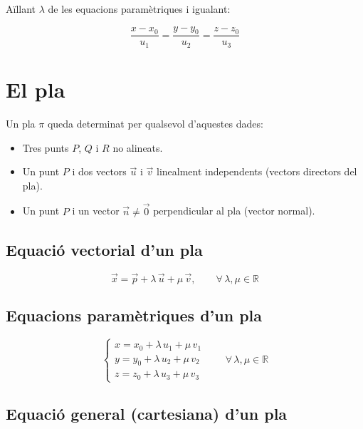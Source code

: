 Aïllant $\lambda$ de les equacions paramètriques i igualant:

\begin{equation*}
\frac{x - x_0}{u_1} = \frac{y - y_0}{u_2} = \frac{z - z_0}{u_3}
\end{equation*}

\section{El pla}

Un pla $\pi$ queda determinat per qualsevol d'aquestes dades:

\begin{itemize}
\item Tres punts $P$, $Q$ i $R$ no alineats.
\item Un punt $P$ i dos vectors $\vec u$ i $\vec v$ linealment independents (vectors directors del pla).
\item Un punt $P$ i un vector $\vec n \neq \vec 0$ perpendicular al pla (vector normal).
\end{itemize}

\subsection{Equació vectorial d'un pla}

\begin{equation*}
\vec x = \vec p + \lambda\,\vec u + \mu\,\vec v, \qquad \forall\,\lambda,\mu\in\mathbb{R}
\end{equation*}

\subsection{Equacions paramètriques d'un pla}

\begin{equation*}
\begin{cases} x = x_0 + \lambda\,u_1 + \mu\,v_1 \\ y = y_0 + \lambda\,u_2 + \mu\,v_2 \\ z = z_0 + \lambda\,u_3 + \mu\,v_3 \end{cases} \qquad \forall\,\lambda,\mu\in\mathbb{R}
\end{equation*}

\subsection{Equació general (cartesiana) d'un pla}

